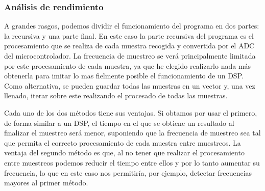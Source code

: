 
\subsubsection{Análisis de rendimiento}

A grandes rasgos, podemos dividir el funcionamiento del programa en dos partes: la recursiva y una parte final. En este caso la parte recursiva del programa es el procesamiento que se realiza de cada muestra recogida y convertida por el ADC del microcontrolador. La frecuencia de muestreo se verá principalmente limitada por este procesamiento de cada muestra, ya que he elegido realizarlo nada más obtenerla para imitar lo mas fielmente posible el funcionamiento de un DSP\@. Como alternativa, se pueden guardar todas las muestras en un vector y, una vez llenado, iterar sobre este realizando el procesado de todas las muestras.

Cada uno de los dos métodos tiene sus ventajas. Si obtamos por usar el primero, de forma similar a un DSP, el tiempo en el que se obtiene un resultado al finalizar el muestreo será menor, suponiendo que la frecuencia de muestreo sea tal que permita el correcto procesamiento de cada muestra entre muestreos. La ventaja del segundo método es que, al no tener que realizar el procesamiento entre muestreos podemos reducir el tiempo entre ellos y por lo tanto aumentar su frecuencia, lo que en este caso nos permitiría, por ejemplo, detectar frecuencias mayores al primer método.
